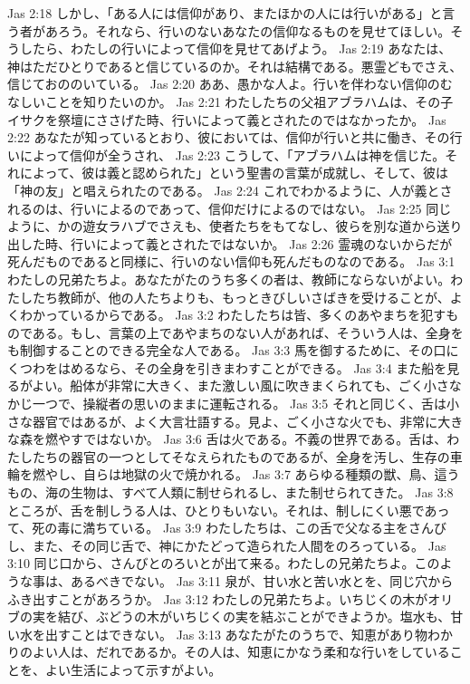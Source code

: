 Jas 2:18  しかし、「ある人には信仰があり、またほかの人には行いがある」と言う者があろう。それなら、行いのないあなたの信仰なるものを見せてほしい。そうしたら、わたしの行いによって信仰を見せてあげよう。
Jas 2:19  あなたは、神はただひとりであると信じているのか。それは結構である。悪霊どもでさえ、信じておののいている。
Jas 2:20  ああ、愚かな人よ。行いを伴わない信仰のむなしいことを知りたいのか。
Jas 2:21  わたしたちの父祖アブラハムは、その子イサクを祭壇にささげた時、行いによって義とされたのではなかったか。
Jas 2:22  あなたが知っているとおり、彼においては、信仰が行いと共に働き、その行いによって信仰が全うされ、
Jas 2:23  こうして、「アブラハムは神を信じた。それによって、彼は義と認められた」という聖書の言葉が成就し、そして、彼は「神の友」と唱えられたのである。
Jas 2:24  これでわかるように、人が義とされるのは、行いによるのであって、信仰だけによるのではない。
Jas 2:25  同じように、かの遊女ラハブでさえも、使者たちをもてなし、彼らを別な道から送り出した時、行いによって義とされたではないか。
Jas 2:26  霊魂のないからだが死んだものであると同様に、行いのない信仰も死んだものなのである。
Jas 3:1  わたしの兄弟たちよ。あなたがたのうち多くの者は、教師にならないがよい。わたしたち教師が、他の人たちよりも、もっときびしいさばきを受けることが、よくわかっているからである。
Jas 3:2  わたしたちは皆、多くのあやまちを犯すものである。もし、言葉の上であやまちのない人があれば、そういう人は、全身をも制御することのできる完全な人である。
Jas 3:3  馬を御するために、その口にくつわをはめるなら、その全身を引きまわすことができる。
Jas 3:4  また船を見るがよい。船体が非常に大きく、また激しい風に吹きまくられても、ごく小さなかじ一つで、操縦者の思いのままに運転される。
Jas 3:5  それと同じく、舌は小さな器官ではあるが、よく大言壮語する。見よ、ごく小さな火でも、非常に大きな森を燃やすではないか。
Jas 3:6  舌は火である。不義の世界である。舌は、わたしたちの器官の一つとしてそなえられたものであるが、全身を汚し、生存の車輪を燃やし、自らは地獄の火で焼かれる。
Jas 3:7  あらゆる種類の獣、鳥、這うもの、海の生物は、すべて人類に制せられるし、また制せられてきた。
Jas 3:8  ところが、舌を制しうる人は、ひとりもいない。それは、制しにくい悪であって、死の毒に満ちている。
Jas 3:9  わたしたちは、この舌で父なる主をさんびし、また、その同じ舌で、神にかたどって造られた人間をのろっている。
Jas 3:10  同じ口から、さんびとのろいとが出て来る。わたしの兄弟たちよ。このような事は、あるべきでない。
Jas 3:11  泉が、甘い水と苦い水とを、同じ穴からふき出すことがあろうか。
Jas 3:12  わたしの兄弟たちよ。いちじくの木がオリブの実を結び、ぶどうの木がいちじくの実を結ぶことができようか。塩水も、甘い水を出すことはできない。
Jas 3:13  あなたがたのうちで、知恵があり物わかりのよい人は、だれであるか。その人は、知恵にかなう柔和な行いをしていることを、よい生活によって示すがよい。

